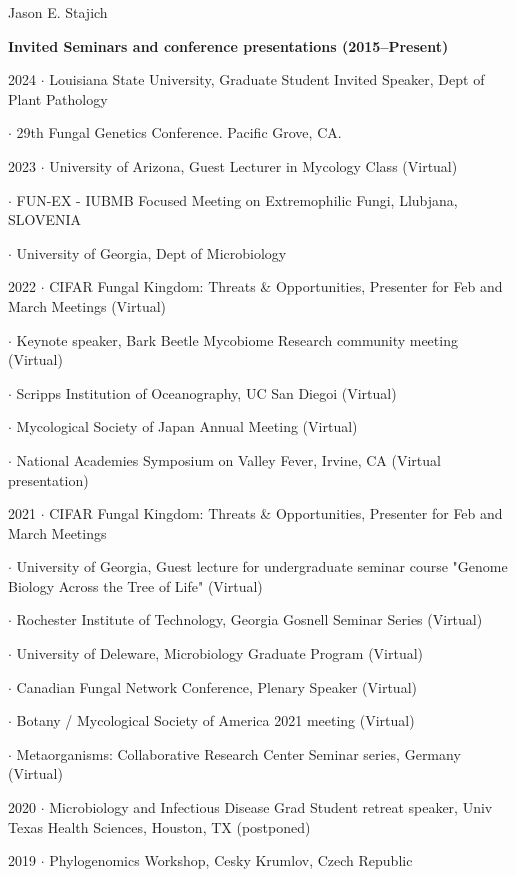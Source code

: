 \documentclass[10pt]{article}
\begin{document}
\begin{cv}{\centerline{Jason E. Stajich}}
\setlength{\cvlabelwidth}{8mm}
\begin{cvlistcompact}{\bf Invited Seminars and conference presentations (2015--Present)}
\item [2024] $\cdot$ Louisiana State University, Graduate Student Invited Speaker, Dept of Plant Pathology
\item $\cdot$ 29th Fungal Genetics Conference. Pacific Grove, CA.
\item [2023] $\cdot$ University of Arizona, Guest Lecturer in Mycology Class (Virtual)
\item $\cdot$ FUN-EX - IUBMB Focused Meeting on Extremophilic Fungi, Llubjana, SLOVENIA
\item $\cdot$ University of Georgia, Dept of Microbiology
\item [2022] $\cdot$ CIFAR Fungal Kingdom: Threats \& Opportunities, Presenter for Feb and March Meetings (Virtual)
\item $\cdot$ Keynote speaker, Bark Beetle Mycobiome Research community meeting (Virtual)
\item $\cdot$ Scripps Institution of Oceanography, UC San Diegoi (Virtual)
\item $\cdot$ Mycological Society of Japan Annual Meeting (Virtual)
\item $\cdot$ National Academies Symposium on Valley Fever, Irvine, CA (Virtual presentation)
\item [2021] $\cdot$ CIFAR Fungal Kingdom: Threats \& Opportunities, Presenter for Feb and March Meetings
\item $\cdot$ University of Georgia, Guest lecture for undergraduate seminar course "Genome Biology Across the Tree of Life" (Virtual)
\item $\cdot$ Rochester Institute of Technology, Georgia Gosnell Seminar Series (Virtual)
\item $\cdot$ University of Deleware, Microbiology Graduate Program (Virtual)
\item $\cdot$ Canadian Fungal Network Conference, Plenary Speaker (Virtual)
\item $\cdot$ Botany / Mycological Society of America 2021 meeting (Virtual)
\item $\cdot$ Metaorganisms: Collaborative Research Center Seminar series, Germany (Virtual)
\item [2020] $\cdot$ Microbiology and Infectious Disease Grad Student retreat speaker, Univ Texas Health Sciences, Houston, TX (postponed)
\item [2019] $\cdot$ Phylogenomics Workshop, Cesky Krumlov, Czech Republic

\end{cvlistcompact}
\end{cv}
\end{document}
